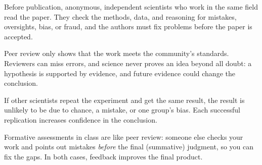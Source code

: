 \documentclass[11pt,letterpaper]{article}
\begin{document}
\modelanswer
\begin{parts}
  \item Before publication, anonymous, independent scientists who work in the same field read the paper. They check the methods, data, and reasoning for mistakes, oversights, bias, or fraud, and the authors must fix problems before the paper is accepted.
  \item Peer review only shows that the work meets the community's standards. Reviewers can miss errors, and science never proves an idea beyond all doubt: a hypothesis is supported by evidence, and future evidence could change the conclusion.
  \item If other scientists repeat the experiment and get the same result, the result is unlikely to be due to chance, a mistake, or one group's bias. Each successful replication increases confidence in the conclusion.
  \item Formative assessments in class are like peer review: someone else checks your work and points out mistakes \emph{before} the final (summative) judgment, so you can fix the gaps. In both cases, feedback improves the final product.
\end{parts}
\end{document}
